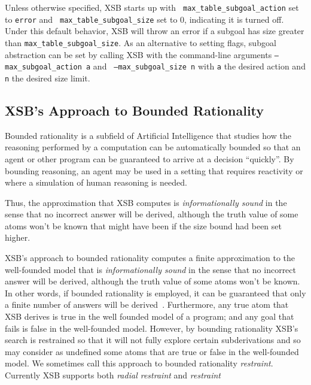 \noindent
Unless otherwise specified, XSB starts up with {\tt
  max\_table\_subgoal\_action} set to {\tt error} and {\tt
  max\_table\_subgoal\_size} set to 0, indicating it is turned off.
Under this default behavior, XSB will throw an error if a subgoal has
size greater than {\tt max\_table\_subgoal\_size}.  As an alternative
to setting flags, subgoal abstraction can be set by calling XSB with
the command-line arguments {\tt --max\_subgoal\_action a} and {\tt
  --max\_subgoal\_size n} with {\tt a} the desired action and {\tt n}
the desired size limit.

\subsection{XSB's Approach to Bounded Rationality} \label{sec:restraint}
%
Bounded rationality is a subfield of Artificial Intelligence that
studies how the reasoning performed by a computation can be
automatically bounded so that an agent or other program can be
guaranteed to arrive at a decision ``quickly''.  By bounding
reasoning, an agent may be used in a setting that requires reactivity
or where a simulation of human reasoning is needed.

Thus, the approximation that XSB computes is {\em
  informationally sound} in the sense that no incorrect answer will be
derived, although the truth value of some atoms won't be known that
might have been if the size bound had been set higher.  

XSB's approach to bounded rationality computes a finite approximation
to the well-founded model that is {\em informationally sound} in the
sense that no incorrect answer will be derived, although the truth
value of some atoms won't be known. In other words, if bounded
rationality is employed, it can be guaranteed that only a finite
number of answers will be derived~\cite{GroS13}.  Furthermore, any
true atom that XSB derives is true in the well founded model of a
program; and any goal that fails is false in the well-founded model.
However, by bounding rationality XSB's search is restrained so that it
will not fully explore certain subderivations and so may consider as
undefined some atoms that are true or false in the well-founded model.
We sometimes call this approach to bounded rationality {\em
  restraint}.  Currently XSB supports both {\em radial restraint} and
{\em \maxans{} restraint}

